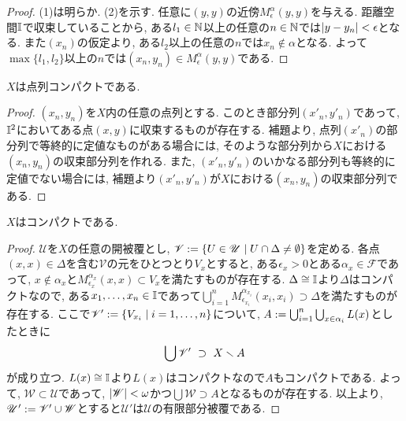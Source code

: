 \documentclass[uplatex, dvipdfmx, a4paper, 12pt, class=jsbook, crop=false]{standalone}
\begin{document}
\begin{proof}
	(1)は明らか. (2)を示す. 任意に$ (y, y) $の近傍$ M_\epsilon^\alpha (y, y) $を与える. 距離空間$ \mathbb{I} $で収束していることから, ある$ l_1 \in \mathbb{N} $以上の任意の$ n \in \mathbb{N} $では$ \left|y - y_n\right| < \epsilon $となる. また$ (x_n) $の仮定より, ある$ l_2 $以上の任意の$ n $では$ x_n \not\in \alpha $となる. よって$ \max\{l_1, l_2\} $以上の$ n $では$ (x_n, y_n) \in M_\epsilon^\alpha (y, y) $である.
\end{proof}

\begin{proposition}
	$ X $は点列コンパクトである.
\end{proposition}

\begin{proof}
	$ (x_n, y_n) $を$ X $内の任意の点列とする. このとき部分列$ (x'_n, y'_n) $であって, $ \mathbb{I}^2 $においてある点$ (x, y) $に収束するものが存在する. 補題より, 点列$ (x'_n) $の部分列で等終的に定値なものがある場合には, そのような部分列から$ X $における$ (x_n, y_n) $の収束部分列を作れる. また, $ (x'_n, y'_n) $のいかなる部分列も等終的に定値でない場合には, 補題より$ (x'_n, y'_n) $が$ X $における$ (x_n, y_n) $の収束部分列である.
\end{proof}

\begin{proposition}
	$ X $はコンパクトである.
\end{proposition}

\begin{proof}
	$ \mathscr{U} $を$ X $の任意の開被覆とし, $ \mathscr{V} \defeq \setcomp{U \in \mathscr{U}}{U \cap \Delta \neq \emptyset} $を定める. 各点$ (x, x) \in \Delta $を含む$ \mathscr{V} $の元をひとつとり$ V_x $とすると, ある$ \epsilon_x > 0 $とある$ \alpha_x \in \mathscr{F} $であって, $ x \notin \alpha_x $と$ M_{\epsilon_x}^{\alpha_x}(x, x) \subset V_x $を満たすものが存在する.
	$ \Delta \cong \mathbb{I} $より$ \Delta $はコンパクトなので, ある$ x_1, \ldots, x_n \in \mathbb{I} $であって$ \bigcup_{i=1}^n M_{\epsilon_{x_i}}^{\alpha_{x_i}} (x_i, x_i) \supset \Delta $を満たすものが存在する.
	ここで$ \mathscr{V'} \defeq \setcomp{V_{x_i}}{i=1,\ldots,n} $について, $ A \mathrel{:=} \bigcup_{i = 1}^n \bigcup_{ x \in \alpha_i} L(x) $としたときに
	$$\bigcup \mathscr{V'} \ \supset\  X \smallsetminus A $$
	が成り立つ.	$L(x) \cong \mathbb{I} $より$ L(x) $はコンパクトなので$ A $もコンパクトである. よって, $ \mathscr{W} \subset \mathscr{U} $であって, $ \left|\mathscr{W}\right| < \omega $かつ$ \bigcup\mathscr{W} \supset A $となるものが存在する. 以上より, $ \mathscr{U'} \mathrel{:=} \mathscr{V'} \cup \mathscr{W} $とすると$ \mathscr{U'} $は$ \mathscr{U} $の有限部分被覆である.
\end{proof}
\end{document}
